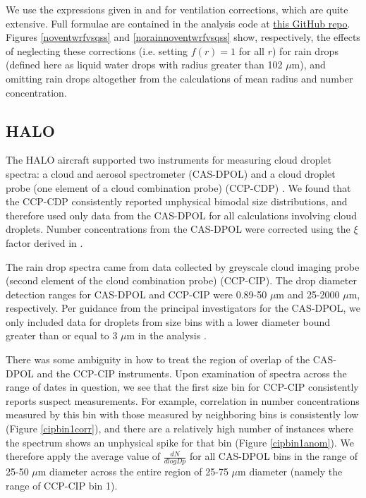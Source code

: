 \documentclass{article}
\begin{document}
We use the expressions given in \cite{Pruppacher2010} and \cite{Rogers1989} for ventilation corrections, which are quite extensive. Full formulae are contained in the analysis code at \href{https://github.com/kt-latimer/20supersat}{this GitHub repo}. Figures \ref{noventwrfvsqss} and \ref{norainnoventwrfvsqss} show, respectively, the effects of neglecting these corrections (i.e. setting $f(r)=1$ for all $r$) for rain drops (defined here as liquid water drops with radius greater than 102 $\mu$m), and omitting rain drops altogether from the calculations of mean radius and number concentration.

\subsection{HALO}

The HALO aircraft supported two instruments for measuring cloud droplet spectra: a cloud and aerosol spectrometer (CAS-DPOL) and a cloud droplet probe (one element of a cloud combination probe) (CCP-CDP) \cite{Braga2017}. We found that the CCP-CDP consistently reported unphysical bimodal size distributions, and therefore used only data from the CAS-DPOL for all calculations involving cloud droplets. Number concentrations from the CAS-DPOL were corrected using the $\xi$ factor derived in \cite{Weigel2016}.

The rain drop spectra came from data collected by greyscale cloud imaging probe (second element of the cloud combination probe) (CCP-CIP). The drop diameter detection ranges for CAS-DPOL and CCP-CIP were 0.89-50 $\mu$m and 25-2000 $\mu$m, respectively. Per guidance from the principal investigators for the CAS-DPOL, we only included data for droplets from size bins with a lower diameter bound greater than or equal to 3 $\mu$m in the analysis \cite{Jurkat2020}.  

There was some ambiguity in how to treat the region of overlap of the CAS-DPOL and the CCP-CIP instruments. Upon examination of spectra across the range of dates in question, we see that the first size bin for CCP-CIP consistently reports suspect measurements. For example, correlation in number concentrations measured by this bin with those measured by neighboring bins is consistently low (Figure \ref{cipbin1corr}), and there are a relatively high number of instances where the spectrum shows an unphysical spike for that bin (Figure \ref{cipbin1anom}). We therefore apply the average value of $\frac{dN}{dlogDp}$ for all CAS-DPOL bins in the range of 25-50 $\mu$m diameter across the entire region of 25-75 $\mu$m diameter (namely the range of CCP-CIP bin 1). 
\end{document}
